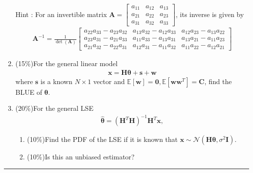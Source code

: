 \documentclass[a4paper,12pt]{article}
\begin{document}
\begin{enumerate}
        Hint : For an invertible matrix $\mathbf A=\begin{bmatrix}a_{11}&a_{12}&a_{13}\\a_{21}&a_{22}&a_{23}\\a_{31}&a_{32}&a_{33}\end{bmatrix}$, its inverse is given by 
        \begin{align*}
        \mathbf A^{-1}=\frac{1}{\det{(\mathbf A)}}\begin{bmatrix}
        a_{22}a_{33}-a_{23}a_{32}   &   a_{13}a_{32}-a_{12}a_{33}   &   a_{12}a_{23}-a_{13}a_{22}\\
        a_{23}a_{31}-a_{21}a_{33}   &   a_{11}a_{33}-a_{13}a_{31}   &   a_{13}a_{21}-a_{11}a_{23}\\
        a_{21}a_{32}-a_{22}a_{31}   &   a_{12}a_{31}-a_{11}a_{32}   &   a_{11}a_{22}-a_{12}a_{21}
        \end{bmatrix}
        \end{align*}
        \item
        (15\%)For the general linear model
        \begin{align*}
            \mathbf x=\mathbf H\bm\theta+\mathbf s+\mathbf w
        \end{align*}
        where $\mathbf s$ is a known $N\times 1$ vector and $\mathbb E[\mathbf w]=\mathbf 0,\mathbb E[\mathbf w\mathbf w^T]=\mathbf C$, find the BLUE of $\bm\theta$.
        \item 
        (20\%)For the general LSE
        \begin{align*}
            \hat{\bm\theta}=(\mathbf H^T\mathbf H)^{-1}\mathbf H^T\mathbf x,
        \end{align*}
        \begin{enumerate}
            \item (10\%)Find the PDF of the LSE if it is known that $\mathbf x\sim\mathcal N(\mathbf H\bm\theta,\sigma^2\mathbf I)$.
            \item (10\%)Is this an unbiased estimator?
        \end{enumerate}
        
    \end{enumerate}
    \rule{\textwidth}{0.4pt}
\end{document}
